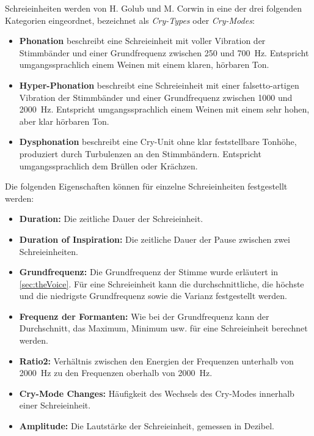 Schreieinheiten werden von H. Golub und M. Corwin in eine der drei folgenden Kategorien eingeordnet, bezeichnet als \emph{Cry-Types} oder \emph{Cry-Modes}:

\begin{itemize}
	\item \textbf{Phonation} beschreibt eine Schreieinheit mit \glqq voller Vibration der Stimmbänder\grqq{} und einer Grundfrequenz zwischen 250 und \SI{700}{\hertz}. Entspricht umgangssprachlich einem Weinen mit einem \glqq klaren, hörbaren Ton\grqq{}.
	\item \textbf{Hyper-Phonation} beschreibt eine Schreieinheit mit einer \glqq falsetto-artigen Vibration der Stimmbänder\grqq{} und einer Grundfrequenz zwischen 1000 und \SI{2000}{\hertz}. Entspricht umgangssprachlich einem Weinen mit einem \glqq sehr hohen, aber klar hörbaren Ton\grqq{}.
	\item \textbf{Dysphonation} beschreibt eine Cry-Unit ohne klar feststellbare Tonhöhe, produziert durch Turbulenzen an den Stimmbändern. Entspricht umgangssprachlich dem \glqq Brüllen oder Krächzen\grqq{}.\cite[S. 61 - 62]{cryModel}
\end{itemize}

Die folgenden Eigenschaften können für einzelne Schreieinheiten festgestellt werden:

\begin{itemize}
	\item \textbf{Duration:} Die zeitliche Dauer der Schreieinheit.
	\item \textbf{Duration of Inspiration: }Die zeitliche Dauer der Pause zwischen zwei Schreieinheiten.
	\item \textbf{Grundfrequenz:} Die Grundfrequenz der Stimme wurde erläutert in \autoref{sec:theVoice}. Für eine Schreieinheit kann die durchschnittliche, die höchste und die niedrigste Grundfrequenz sowie die Varianz festgestellt werden.
	\item \textbf{Frequenz der Formanten:} Wie bei der Grundfrequenz kann der Durchschnitt, das Maximum, Minimum usw. für eine Schreieinheit berechnet werden.
	\item \textbf{Ratio2: } Verhältnis zwischen den Energien der Frequenzen unterhalb von \SI{2000}{\hertz} zu den Frequenzen oberhalb von \SI{2000}{\hertz}.
	\item \textbf{Cry-Mode Changes:} Häufigkeit des Wechsels des Cry-Modes innerhalb einer Schreieinheit.
	\item \textbf{Amplitude:} Die Lautstärke der Schreieinheit, gemessen in Dezibel.\cite[S. 85]{parentalPerception} \cite[S. 156]{threeCryTypes}
\end{itemize}

